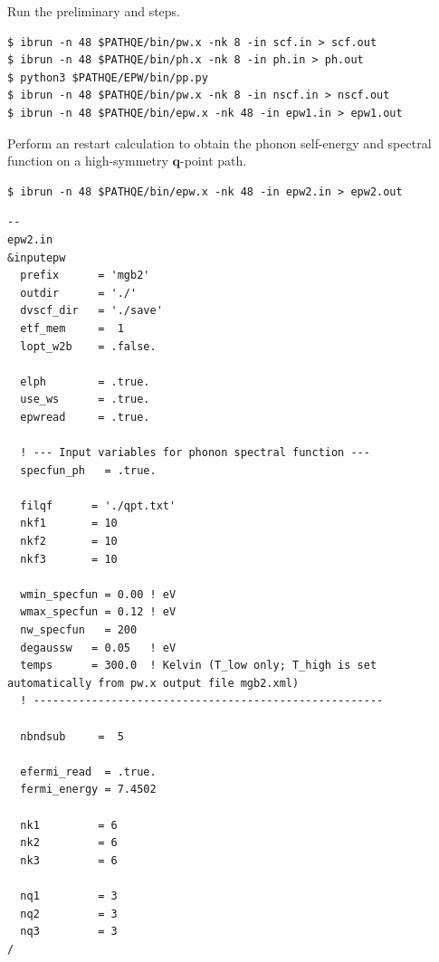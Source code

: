 \documentclass[a4paper,11pt,serif]{article}
\newcommand{\mb}[1]{\mathbf{#1}}
\begin{document}
\vspace{0.2cm}

\action Run the preliminary  and  steps.

\begin{verbatim}
$ ibrun -n 48 $PATHQE/bin/pw.x -nk 8 -in scf.in > scf.out
$ ibrun -n 48 $PATHQE/bin/ph.x -nk 8 -in ph.in > ph.out
$ python3 $PATHQE/EPW/bin/pp.py
$ ibrun -n 48 $PATHQE/bin/pw.x -nk 8 -in nscf.in > nscf.out
$ ibrun -n 48 $PATHQE/bin/epw.x -nk 48 -in epw1.in > epw1.out
\end{verbatim}

\vspace{0.5cm}

\action Perform an  restart calculation to obtain the phonon self-energy and spectral function on a high-symmetry $\mb{q}$-point path.

\begin{verbatim}
$ ibrun -n 48 $PATHQE/bin/epw.x -nk 48 -in epw2.in > epw2.out
\end{verbatim}

\begin{scriptsize}
\begin{Verbatim}[frame=single]
--                                                                                                 epw2.in
&inputepw
  prefix      = 'mgb2'
  outdir      = './'
  dvscf_dir   = './save'
  etf_mem     =  1
  lopt_w2b    = .false.

  elph        = .true.
  use_ws      = .true.
  epwread     = .true.

  ! --- Input variables for phonon spectral function ---
  specfun_ph   = .true.

  filqf      = './qpt.txt'
  nkf1       = 10
  nkf2       = 10
  nkf3       = 10

  wmin_specfun = 0.00 ! eV
  wmax_specfun = 0.12 ! eV
  nw_specfun   = 200
  degaussw   = 0.05   ! eV
  temps      = 300.0  ! Kelvin (T_low only; T_high is set automatically from pw.x output file mgb2.xml)
  ! ------------------------------------------------------

  nbndsub     =  5

  efermi_read  = .true.
  fermi_energy = 7.4502

  nk1         = 6
  nk2         = 6
  nk3         = 6

  nq1         = 3
  nq2         = 3
  nq3         = 3
/
\end{Verbatim}
\end{scriptsize}
\end{document}
